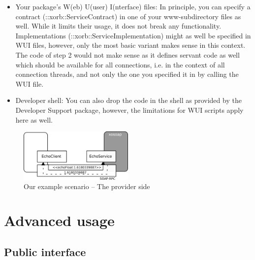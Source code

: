 \begin{enumerate}
\begin{itemize}
\item Your package's W(eb) U(user) I(nterface) files: In principle, you can specify a contract (::xorb::ServiceContract) in one of your www-subdirectory files as well. While it limits their usage, it does not break any functionality. Implementations (::xorb::ServiceImplementation) might as well be specified in WUI files, however, only the most basic variant makes sense in this context. The code of step 2 would not make sense as it defines servant code as well which should be available for all connections, i.e. in the context of all connection threads, and not only the one you specified it in by calling the WUI file.
\item Developer shell: You can also drop the code in the shell as provided by the Developer Support package, however, the limitations for WUI scripts apply here as well.
\end{itemize}

\end{enumerate}
  \begin{figure}[htbp]
\begin{center}
\includegraphics[width=0.5\textwidth]{img/provider.png}
\caption{Our example scenario -- The provider side}
\label{fig:quickstart:xosoap:2}
\end{center}
\end{figure}
  \section{Advanced usage}\label{sec:advanced}
    \subsection{Public interface}\label{sec:interface}
